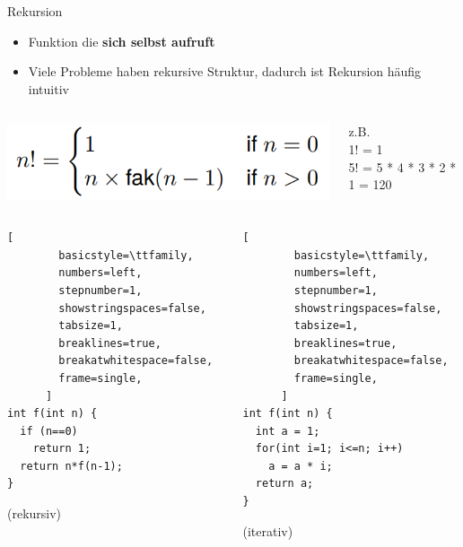 \documentclass[
  german,            %
  aspectratio=169,    %
]{tumbeamer}
\begin{document}
\begin{frame}[c, fragile]{Rekursion}{}
  \begin{itemize}
    \item Funktion die \textbf{sich selbst aufruft}
    \item Viele Probleme haben rekursive Struktur, dadurch ist Rekursion häufig intuitiv
  \end{itemize}
  \begin{columns}[c]
    \begin{column}{0.48\textwidth}
      \includegraphics[width=0.9\linewidth]{w04_fak_rec_zue.png}
    \end{column}
    \begin{column}{0.48\textwidth}
      z.B. \\
      1! = 1 \\
      5! = 5 * 4 * 3 * 2 * 1 = 120
    \end{column}
  \end{columns}
  \begin{columns}[c]
    \begin{column}{0.48\textwidth}
      \begin{lstlisting}[
        basicstyle=\ttfamily,
        numbers=left,
        stepnumber=1,
        showstringspaces=false,
        tabsize=1,
        breaklines=true,
        breakatwhitespace=false,
        frame=single,
      ]
int f(int n) {
  if (n==0)
    return 1;
  return n*f(n-1);
}
      \end{lstlisting}
      \centering
      (rekursiv)
    \end{column}
    \begin{column}{0.48\textwidth}
      \begin{lstlisting}[
        basicstyle=\ttfamily,
        numbers=left,
        stepnumber=1,
        showstringspaces=false,
        tabsize=1,
        breaklines=true,
        breakatwhitespace=false,
        frame=single,
      ]
int f(int n) {
  int a = 1;
  for(int i=1; i<=n; i++)
    a = a * i;
  return a;
}
      \end{lstlisting}
      \centering
      (iterativ)
    \end{column}
  \end{columns}
\end{frame}
\end{document}
